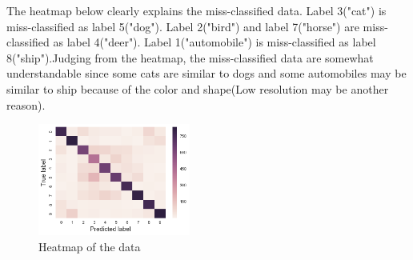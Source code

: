 The heatmap below clearly explains the miss-classified data. Label 3("cat") is miss-classified as label 5("dog"). Label 2("bird") and label 7("horse") are miss-classified as label 4("deer"). Label 1("automobile") is miss-classified as label 8("ship").Judging from the heatmap, the miss-classified data are somewhat understandable since some cats are similar to dogs and some automobiles may be similar to ship because of the color and shape(Low resolution may be another reason).




\begin{figure}[H]

	\begin{center}
	\includegraphics[width=5cm]{picture/heatmap.png}
	\caption{Heatmap of the data}
	\end{center}
	\label{fig:17}

\end{figure}